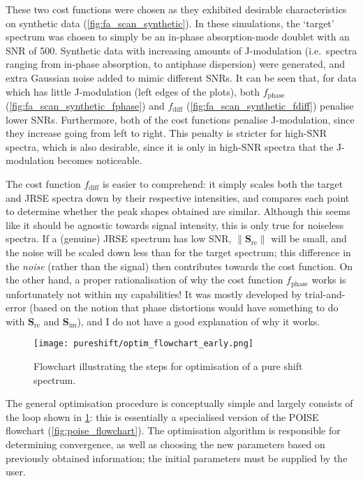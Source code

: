 These two cost functions were chosen as they exhibited desirable characteristics on synthetic data (\cref{fig:fa_scan_synthetic}).
In these simulations, the `target' spectrum was chosen to simply be an in-phase absorption-mode doublet with an SNR of 500.
Synthetic data with increasing amounts of J-modulation (i.e.\ spectra ranging from in-phase absorption, to antiphase dispersion) were generated, and extra Gaussian noise added to mimic different SNRs.
It can be seen that, for data which has little J-modulation (left edges of the plots), both $f_\text{phase}$ (\cref{fig:fa_scan_synthetic_fphase}) and $f_\text{diff}$ (\cref{fig:fa_scan_synthetic_fdiff}) penalise lower SNRs.
Furthermore, both of the cost functions penalise J-modulation, since they increase going from left to right.
This penalty is stricter for high-SNR spectra, which is also desirable, since it is only in high-SNR spectra that the J-modulation becomes noticeable.

The cost function $f_\text{diff}$ is easier to comprehend: it simply scales both the target and JRSE spectra down by their respective intensities, and compares each point to determine whether the peak shapes obtained are similar.
Although this seems like it should be agnostic towards signal intensity, this is only true for noiseless spectra.
If a (genuine) JRSE spectrum has low SNR, $\lVert \symbf{S}_\text{re} \rVert$ will be small, and the noise will be scaled down less than for the target spectrum; this difference in the \textit{noise} (rather than the signal) then contributes towards the cost function.
On the other hand, a proper rationalisation of why the cost function $f_\text{phase}$ works is unfortunately not within my capabilities!
It was mostly developed by trial-and-error (based on the notion that phase distortions would have something to do with $\symbf{S}_\text{re}$ and $\symbf{S}_\text{im}$), and I do not have a good explanation of why it works.

\begin{figure}[htbp]
    \centering
    \texttt{[image: pureshift/optim\_flowchart\_early.png]}
    \caption[Flowchart for pure shift optimisation process]{
        Flowchart illustrating the steps for optimisation of a pure shift spectrum.
    }
    \label{fig:optim_flowchart_early}
\end{figure}

The general optimisation procedure is conceptually simple and largely consists of the loop shown in \cref{fig:optim_flowchart_early}: this is essentially a specialised version of the POISE flowchart (\cref{fig:poise_flowchart}).
The optimisation algorithm is responsible for determining convergence, as well as choosing the new parameters based on previously obtained information; the initial parameters must be supplied by the user.


